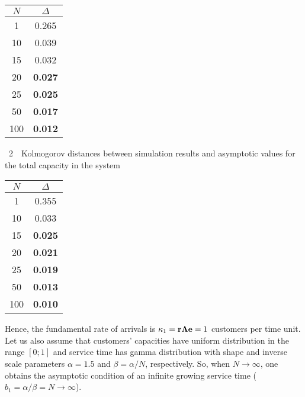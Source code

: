 \begin{multicols}{2}
\begin{center}
\begin{minipage}[t]{34mm}
\vspace*{6pt}


{\small
\tabcolsep=14pt
\begin{tabular}{cc}
\hline
$N$ & $\Delta$\\
\hline
\hphantom{9}1 & 0.265\\
10 & 0.039\\
15 & 0.032\\
20 & \textbf{0.027}\\
25 & \textbf{0.025}\\
50 & \textbf{0.017}\\
100\hphantom{9} & \textbf{0.012}\\
\hline
\end{tabular}
}
\end{minipage}
\hfill
\begin{minipage}[t]{34mm}
{{\tablename~2}\ \ \small{Kolmogorov distances between simulation results and asymptotic values for the total capacity in the system}}

\vspace*{6pt}

{\small 
\tabcolsep=14pt
\begin{tabular}{cc}
\hline
$N$ & $\Delta$\\
\hline
\hphantom{9}1 & 0.355\\
10 & 0.033\\
15 & \textbf{0.025}\\
20 & \textbf{0.021}\\
25 & \textbf{0.019}\\
50 & \textbf{0.013}\\
100\hphantom{9} &\textbf{0.010}\\
\hline
\end{tabular}
}
\end{minipage}
\end{center}

\vspace*{9pt}

\setcounter{table}{2}

Hence, the fundamental rate of arrivals is $\kappa_1\linebreak =\mathbf{r\Lambda e}=1$ 
customers per time unit. Let us also assume that customers' capacities have 
uniform distribution in the range $[0;1]$ and service time has gamma distribution 
with shape and inverse scale parameters $\alpha = 1.5$ and $\beta = \alpha/ N$, 
respectively. So, when $N \to\infty$, one obtains the asymptotic condition of 
an infinite growing service time ($b_1 = \alpha / \beta = N \to \infty$).


\end{multicols}
